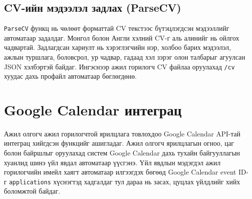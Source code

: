 \subsection*{CV-ийн мэдээлэл задлах (ParseCV)}

\par \noindent \texttt{ParseCV} функц нь чөлөөт форматтай CV текстээс бүтэцлэгдсэн мэдээллийг автоматаар задалдаг. Монгол болон Англи хэлний CV-г аль алинийг нь ойлгох чадвартай. Задлагдсан хариулт нь хэрэглэгчийн нэр, холбоо барих мэдээлэл, ажлын туршлага, боловсрол, ур чадвар, гадаад хэл зэрэг олон талбарыг агуулсан JSON хэлбэртэй байдаг. Ингэснээр ажил горилогч CV файлаа оруулахад \texttt{/cv} хуудас дахь профайл автоматаар бөглөгдөнө.





\section{Google Calendar интеграц}

\paragraph{} Ажил олгогч ажил горилогчтой ярилцлага товлохдоо Google Calendar API-тай интеграц хийгдсэн функцийг ашигладаг. Ажил олгогч ярилцлагын огноо, цаг болон байршлыг оруулахад систем Google Calendar дахь тухайн байгууллагын хуанлид шинэ үйл явдал автоматаар үүсгэнэ. Үйл явдлын мэдэгдэл ажил горилогчийн имейл хаягт автоматаар илгээгдэх бөгөөд Google Calendar event ID-г \texttt{applications} хүснэгтэд хадгалдаг тул дараа нь засах, цуцлах үйлдлийг хийх боломжтой байдаг.

